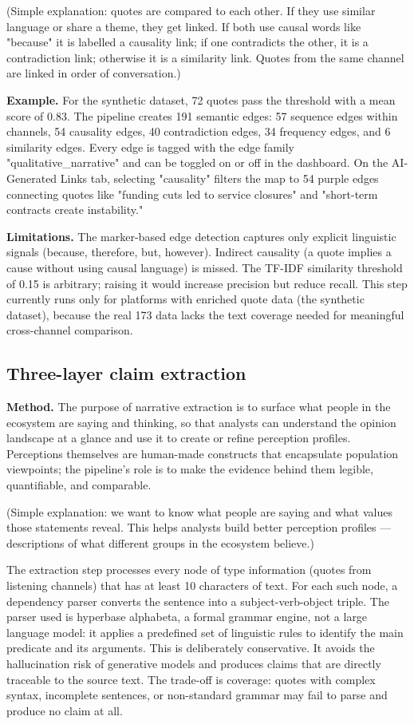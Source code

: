 \documentclass[11pt,a4paper]{article}
\begin{document}
(Simple explanation: quotes are compared to each other. If they use
similar language or share a theme, they get linked. If both use causal
words like "because" it is labelled a causality link; if one contradicts
the other, it is a contradiction link; otherwise it is a similarity
link. Quotes from the same channel are linked in order of conversation.)

\textbf{Example.} For the synthetic dataset, 72 quotes pass the threshold
with a mean score of 0.83. The pipeline creates 191 semantic edges: 57
sequence edges within channels, 54 causality edges, 40 contradiction
edges, 34 frequency edges, and 6 similarity edges. Every edge is tagged
with the edge family "qualitative\_narrative" and can be toggled on or
off in the dashboard. On the AI-Generated Links tab, selecting
"causality" filters the map to 54 purple edges connecting quotes like
"funding cuts led to service closures" and "short-term contracts create
instability."

\textbf{Limitations.} The marker-based edge detection captures only explicit
linguistic signals (because, therefore, but, however). Indirect causality
(a quote implies a cause without using causal language) is missed. The
TF-IDF similarity threshold of 0.15 is arbitrary; raising it would
increase precision but reduce recall. This step currently runs only for
platforms with enriched quote data (the synthetic dataset), because the
real 173 data lacks the text coverage needed for meaningful cross-channel
comparison.

\subsection{Three-layer claim extraction}

\textbf{Method.} The purpose of narrative extraction is to surface what people
in the ecosystem are saying and thinking, so that analysts can understand
the opinion landscape at a glance and use it to create or refine
perception profiles. Perceptions themselves are human-made constructs
that encapsulate population viewpoints; the pipeline's role is to make
the evidence behind them legible, quantifiable, and comparable.

(Simple explanation: we want to know what people are saying and what
values those statements reveal. This helps analysts build better
perception profiles — descriptions of what different groups in the
ecosystem believe.)

The extraction step processes every node of type information (quotes
from listening channels) that has at least 10 characters of text. For
each such node, a dependency parser converts the sentence into a
subject-verb-object triple. The parser used is hyperbase alphabeta, a
formal grammar engine, not a large language model: it applies a
predefined set of linguistic rules to identify the main predicate and
its arguments. This is deliberately conservative. It avoids the
hallucination risk of generative models and produces claims that are
directly traceable to the source text. The trade-off is coverage: quotes
with complex syntax, incomplete sentences, or non-standard grammar may
fail to parse and produce no claim at all.
\end{document}
